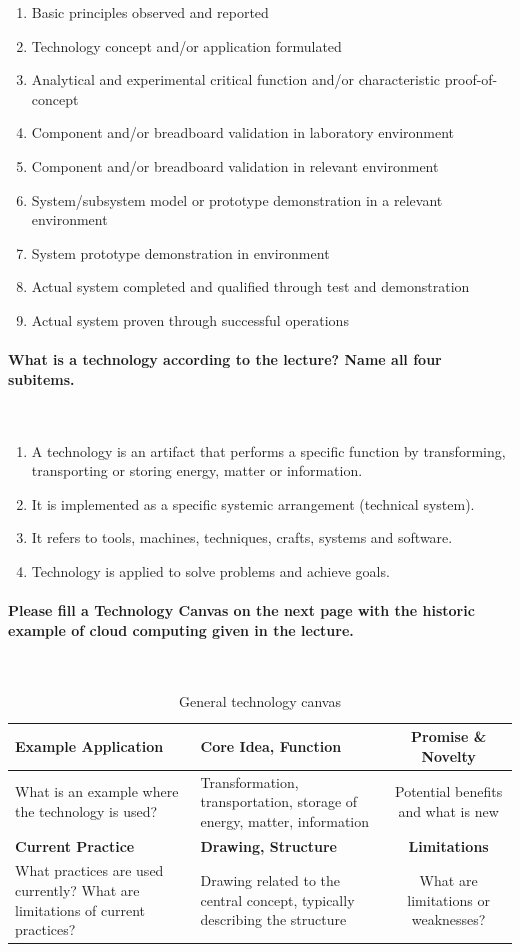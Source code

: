 \documentclass[10pt,a4paper,noendnumber=true]{scrartcl}
\newcommand{\properparagraph}[1]{\paragraph{\textcolor{Emerald}{#1}}\mbox{}\\}
\begin{document}
\begin{enumerate}
	\item Basic principles observed and reported
	\item Technology concept and/or application formulated
	\item Analytical and experimental critical function and/or characteristic proof-of-concept
	\item Component and/or breadboard validation in laboratory environment
	\item Component and/or breadboard validation in relevant environment
	\item System/subsystem model or prototype demonstration in a relevant environment
	\item System prototype demonstration in environment
	\item Actual system completed and qualified through test and demonstration
	\item Actual system proven through successful operations 
\end{enumerate}
\properparagraph{What is a technology according to the lecture? Name all four subitems.}
\begin{enumerate}
	\item A technology is an artifact that performs a specific function by transforming, transporting or storing energy, matter or information.
	\item It is implemented as a specific systemic arrangement (technical system).
	\item It refers to tools, machines, techniques, crafts, systems and software.
	\item Technology is applied to solve problems and achieve goals.
\end{enumerate}

\newpage
\properparagraph{Please fill a Technology Canvas on the next page with the historic example of cloud computing given in the lecture.}

\begin{table}[tbh!]
		\centering
		\caption{General technology canvas}
		\begin{tabularx}{\textwidth}{XXc}
			\toprule
			\textbf{Example Application} & \textbf{Core Idea, Function} & \textbf{Promise \& Novelty} \\
			\midrule
			What is an example where the technology is used? & Transformation, transportation, storage of energy, matter, information & Potential benefits and what is new \\
			\midrule
			\textbf{Current Practice} & \textbf{Drawing, Structure} & \textbf{Limitations} \\
			\midrule
			What practices are used currently? What are limitations of current practices? & Drawing related to the central concept, typically describing the structure & What are limitations or weaknesses? \\
			\bottomrule
		\end{tabularx}
\end{table}
\end{document}
